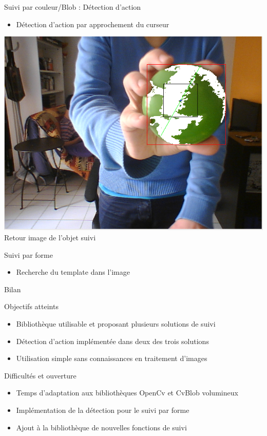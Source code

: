 \documentclass{beamer}
\begin{document}
		\begin{frame}{Suivi par couleur/Blob : Détection d'action}
			\begin{itemize}
				\item{Détection d'action par approchement du curseur}
			\end{itemize}
			\begin{center}
				\includegraphics[scale=0.25]{Capture3.png}\\
				Retour image de l'objet suivi
			\end{center}
		\end{frame}
		\begin{frame}{Suivi par forme}
			\begin{itemize}
				\item{Recherche du template dans l'image}
			\end{itemize}
		\end{frame}
		

		\begin{frame}{Bilan}
			\begin{exampleblock}{Objectifs atteints}
				\begin{itemize}
				\item Bibliothèque utilisable et proposant plusieurs solutions de suivi
				\item Détection d'action implémentée dans deux des trois solutions
				\item Utilisation simple sans connaissances en traitement d'images
				\end{itemize}
			\end{exampleblock}
			\pause
			\begin{alertblock}{Difficultés et ouverture}
				\begin{itemize}
				\item Temps d'adaptation aux bibliothèques OpenCv et CvBlob volumineux
				\item Implémentation de la détection pour le suivi par forme
				\item Ajout à la bibliothèque de nouvelles fonctions de suivi
				\end{itemize}
			\end{alertblock}
		\end{frame}
	
\end{document}

